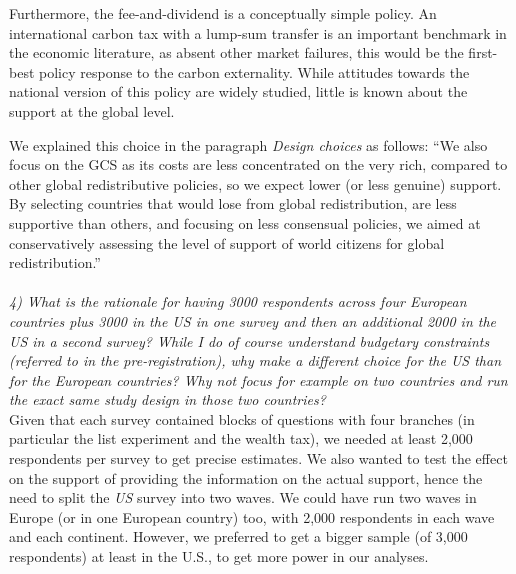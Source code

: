 \documentclass[12pt,english]{article}
\begin{document}
Furthermore, the fee-and-dividend is a conceptually simple policy. An international carbon tax with a lump-sum transfer is an important benchmark in the economic literature, as absent other market failures, this would be the first-best policy response to the carbon externality. While attitudes towards the national version of this policy are widely studied, little is known about the support at the global level. %

We explained this choice in the paragraph \textit{Design choices} as follows: ``We also focus on the GCS as its costs are less concentrated on the very rich, compared to other global redistributive policies, so we expect lower (or less genuine) support. By selecting countries that would lose from global redistribution, are less supportive than others, and focusing on less consensual policies, we aimed at conservatively assessing the level of support of world citizens for global redistribution.''
~\\ ~\\


\textit{4) What is the rationale for having 3000 respondents across four European countries plus 3000 in the US in one survey and then an additional 2000 in the US in a second survey? While I do of course understand budgetary constraints (referred to in the pre-registration), why make a different choice for the US than for the European countries? Why not focus for example on two countries and run the exact same study design in those two countries?}~\\

Given that each survey contained blocks of questions with four branches (in particular the list experiment and the wealth tax), we needed at least 2,000 respondents per survey to get precise estimates. We also wanted to test the effect on the support of providing the information on the actual support, hence the need to split the \textit{US} survey into two waves. We could have run two waves in Europe (or in one European country) too, with 2,000 respondents in each wave and each continent. However, we preferred to get a bigger sample (of 3,000 respondents) at least in the U.S., to get more power in our analyses.
\end{document}
